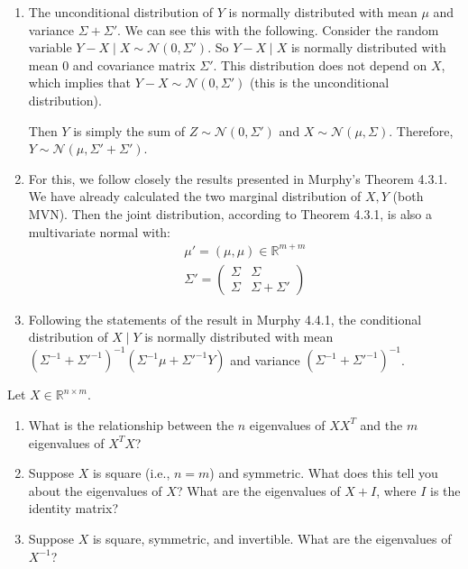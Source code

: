 \documentclass{harvardml}
\newcommand{\R}{\mathbb{R}}
\begin{document}
\begin{enumerate}[label=(\alph*)]
  \item The unconditional distribution of $Y$ is normally distributed with mean $\mu$ and variance $\Sigma + \Sigma'$. We can see this with the following. Consider the random variable $Y - X \mid X \sim \mathcal{N}(0,\Sigma')$. So $Y-X \mid X$ is normally distributed with mean $0$ and covariance matrix $\Sigma'$. This distribution does not depend on $X$, which implies that $Y - X \sim \mathcal{N}(0,\Sigma')$ (this is the unconditional distribution).

  Then $Y$ is simply the sum of $Z \sim \mathcal{N}(0,\Sigma')$ and $X \sim \mathcal{N}(\mu, \Sigma)$. Therefore, $Y \sim \mathcal{N}(\mu, \Sigma' + \Sigma')$.
  \item For this, we follow closely the results presented in Murphy's Theorem 4.3.1. We have already calculated the two marginal distribution of $X,Y$ (both MVN). Then the joint distribution, according to Theorem 4.3.1, is also a multivariate normal with:
  \begin{align*}
    \mu' = (\mu, \mu) \in \mathbb{R}^{m+m} \\
    \Sigma' =  \left( \begin{array}{cc}
\Sigma & \Sigma\\
\Sigma & \Sigma + \Sigma' \end{array} \right)
  \end{align*}
  \item Following the statements of the result in Murphy 4.4.1, the conditional distribution of $X \mid Y$ is normally distributed with mean $(\Sigma^{-1} + \Sigma'^{-1})^{-1}(\Sigma^{-1}\mu + \Sigma'^{-1}Y)$ and variance $(\Sigma^{-1} + \Sigma'^{-1})^{-1}$.
\end{enumerate}


\begin{problem}
Let $X \in \R^{n \times m}$.
\begin{enumerate}[label=(\alph*)]
\item What is the relationship between the $n$ eigenvalues of $XX^T$ and the $m$ eigenvalues of $X^TX$?
\item Suppose $X$ is square (i.e., $n=m$) and symmetric. What does this tell you about the eigenvalues of $X$? What are the eigenvalues of $X + I$, where $I$ is the identity matrix?
\item Suppose $X$ is square, symmetric, and invertible. What are the eigenvalues of $X^{-1}$?
\end{enumerate}
\end{problem}
\end{document}
